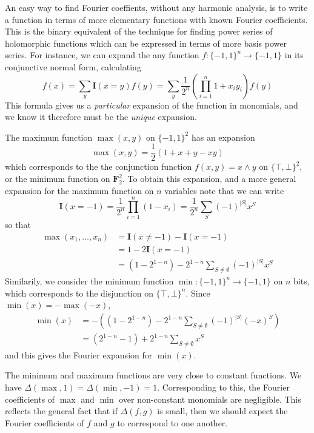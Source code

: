An easy way to find Fourier coeffients, without any harmonic analysis, is to write a function in terms of more elementary functions with known Fourier coefficients. This is the binary equivalent of the technique for finding power series of holomorphic functions which can be expressed in terms of more basis power series. For instance, we can expand the any function $f: \{ -1, 1 \}^n \to \{ -1, 1 \}$ in its conjunctive normal form, calculating
%
\[ f(x) = \sum_y \mathbf{I}(x = y) f(y) = \sum_y \frac{1}{2^n} \left( \prod_{i = 1}^n 1 + x_iy_i \right) f(y) \]
%
This formula gives us a {\it particular} expansion of the function in monomials, and we know it therefore must be the {\it unique} expansion.

\begin{example}
    The maximum function $\max(x,y)$ on $\{ -1, 1 \}^2$ has an expansion
    \[ \max(x,y) = \frac{1}{2} \left( 1 + x + y - xy \right) \]
    which corresponds to the the conjunction function $f(x,y) = x \wedge y$ on $\{ \top, \bot \}^2$, or the minimum function on $\mathbf{F}_2^2$. To obtain this expansion, and a more general expansion for the maximum function on $n$ variables note that we can write
    \[ \mathbf{I}(x = -1) = \frac{1}{2^n} \prod_{i = 1}^n (1 - x_i) = \frac{1}{2^n} \sum_S (-1)^{|S|} x^S \]
    so that
    \begin{align*}
        \max(x_1, \dots, x_n) &= \mathbf{I}(x \neq -1) - \mathbf{I}(x = -1)\\
        &= 1 - 2 \mathbf{I}(x = -1)\\
        &= (1 - 2^{1-n}) - 2^{1-n} \sum_{S \neq \emptyset} (-1)^{|S|} x^S
    \end{align*}
    Similarily, we consider the minimum function $\min: \{ -1, 1 \}^n \to \{ -1, 1 \}$ on $n$ bits, which corresponds to the disjunction on $\{ \top, \bot \}^n$. Since $\min(x) = -\max(-x)$,
    \begin{align*}
        \min(x) &= - \left( ( 1 - 2^{1-n} ) - 2^{1-n} \sum_{S \neq \emptyset} (-1)^{|S|} (-x)^S \right)\\
        &= ( 2^{1-n} - 1 ) + 2^{1-n} \sum_{S \neq \emptyset} x^S
    \end{align*}
    and this gives the Fourier expansion for $\min(x)$.
\end{example}

The minimum and maximum functions are very close to constant functions. We have $\Delta(\max, 1) = \Delta(\min, -1) = 1$. Corresponding to this, the Fourier coefficients of $\max$ and $\min$ over non-constant monomials are negligible. This reflects the general fact that if $\Delta(f,g)$ is small, then we should expect the Fourier coefficients of $f$ and $g$ to correspond to one another.

